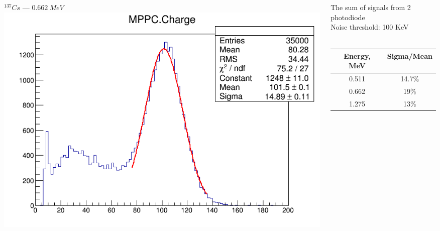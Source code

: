 \documentclass[11pt]{beamer}
\begin{document}
\begin{frame}
    \begin{columns}
    \begin{column}{0.5\textwidth}
        $^{137}Cs$ --- $0.662~MeV$\\
        \includegraphics[width=1\textwidth]{figures/setup2.png}
    \end{column}
    \begin{column}{0.5\textwidth}
                The sum of signals from 2 photodiode\\
                Noise threshold: 100 KeV\\
                ~\\
        \begin{tabular}[c]{|c|c|}
             \hline 
            Energy, MeV & Sigma/Mean \\
            \hline 
           0.511 & 14.7\%  \\ 
            \hline 
            0.662 & 19\%\\ 
            \hline 
            1.275 & 13\%\\
            \hline 
        \end{tabular} 
\\

    \end{column}
\end{columns} 
     
\end{frame}
\end{document}
